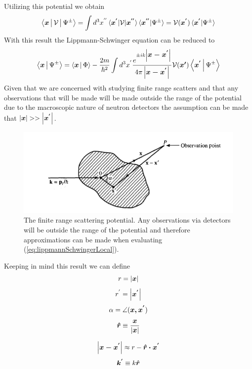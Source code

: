 Utilizing this potential we obtain 
\begin{equation}
\label{eq:localPotentialResult}
\Braket{\mbox{\boldmath$x$}|\mathcal{V}|\Psi^{\pm}}=\int d^3x^{''} \braket{\mbox{\boldmath$x^{'}$}|\mathcal{V}|\mbox{\boldmath$x^{''}$}} \braket{\mbox{\boldmath$x^{''}$}|\Psi^{\pm}}=\mathcal{V}(\mbox{\boldmath$x^{'}$})\braket{\mbox{\boldmath$x^{'}$}|\Psi^{\pm}}
\end{equation}
With this result the Lippmann-Schwinger equation can be reduced to
\begin{equation}
\label{eq:lippmannSchwingerLocal}
 \Braket{\mbox{\boldmath$x$}|\Psi^{\pm}}=\Braket{\mbox{\boldmath$x$}|\Phi} -\frac{2m}{\hbar^2} \int d^3x^{'} \frac{e^{\pm ik\left|\mbox{\boldmath$x-x^{'}$}\right|}}{ 4\pi \left| \mbox{\boldmath$x-x^{'}$} \right|} \mathcal{V}(\mbox{\boldmath$x{'}$})\Braket{\mbox{\boldmath$x^{'}$}|\Psi^{\pm}}
\end{equation}
Given that we are concerned with studying finite range scatters and that any observations that will be made will be made outside the range of the potential due to the macroscopic nature of neutron detectors the assumption can be made that $\left|\mbox{\boldmath$x$}\right| >>\left|\mbox{\boldmath$x^{'}$}\right|$. 
\begin{figure}[ht!]
\centering
\includegraphics[scale=0.5]{Figures/scatteringObservation.png}
\caption{The finite range scattering potential. Any observations via detectors will be outside the range of the potential and therefore approximations can be made when evaluating (\ref{eq:lippmannSchwingerLocal}).}
\label{fig:finiteRangePotential}
\end{figure}

Keeping in mind this result we can define 
$$ r = \left| \mbox{\boldmath$x$} \right| $$
$$r^{'}=\left|\mbox{\boldmath$x^{'}$}\right|$$
$$\alpha = \angle(\mbox{\boldmath$x,x^{'}$})$$
$$\mbox{\boldmath$\hat{r}$} \equiv \frac{\mbox{\boldmath$x$}}{\left|\mbox{\boldmath$x$}\right|}$$

\begin{equation}
\label{eq:toObservation}
\left|\mbox{\boldmath$x-x^{'}$}\right| \approx r-\mbox{\boldmath$\hat{r}\cdot x^{'}$}
\end{equation}
\begin{equation}
\label{eq:propogationVector}
\mbox{\boldmath$k^{'}$} \equiv k\mbox{\boldmath$\hat{r}$}
\end{equation}


